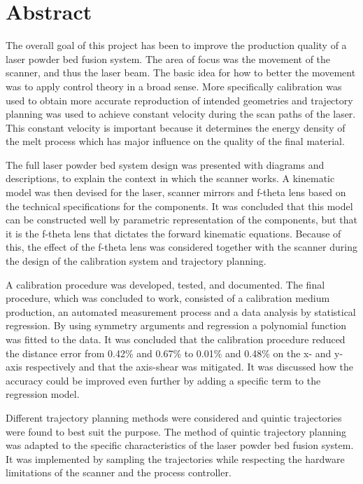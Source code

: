 \section*{Abstract}

The overall goal of this project has been to improve the production quality of a laser powder bed fusion system. The area of focus was the movement of the scanner, and thus the laser beam. The basic idea for how to better the movement was to apply control theory in a broad sense. More specifically calibration was used to obtain more accurate reproduction of intended geometries and trajectory planning was used to achieve constant velocity during the scan paths of the laser. This constant velocity is important because it determines the energy density of the melt process which has major influence on the quality of the final material.

The full laser powder bed system design was presented with diagrams and descriptions, to explain the context in which the scanner works. A kinematic model was then devised for the laser, scanner mirrors and f-theta lens based on the technical specifications for the components. It was concluded that this model can be constructed well by parametric representation of the components, but that it is the f-theta lens that dictates the forward kinematic equations. Because of this, the effect of the f-theta lens was considered together with the scanner during the design of the calibration system and trajectory planning.

A calibration procedure was developed, tested, and documented. The final procedure, which was concluded to work, consisted of a calibration medium production, an automated measurement process and a data analysis by statistical regression. By using symmetry arguments and regression a polynomial function was fitted to the data. It was concluded that the calibration procedure reduced the distance error from 0.42\% and 0.67\% to 0.01\% and 0.48\% on the x- and y-axis respectively and that the axis-shear was mitigated. It was discussed how the accuracy could be improved even further by adding a specific term to the regression model.

Different trajectory planning methods were considered and quintic trajectories were found to best suit the purpose. The method of quintic trajectory planning was adapted to the specific characteristics of the laser powder bed fusion system. It was implemented by sampling the trajectories while respecting the hardware limitations of the scanner and the process controller.

